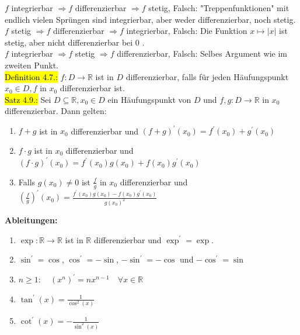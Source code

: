 \documentclass[10pt,landscape]{article}
\newcommand{\yellow}[1]{\sethlcolor{yellow} \hl{#1}}
\newcommand{\blue}[1]{\sethlcolor{cyan} \hl{#1}}
\begin{document}
\begin{multicols}{3}
$f$ integrierbar $\Longrightarrow f$ differenzierbar $\Longrightarrow f$ stetig, Falsch: "Treppenfunktionen" mit endlich vielen Sprüngen sind integrierbar, aber weder differenzierbar, noch stetig.\\
$f$ stetig $\Longrightarrow f$ differenzierbar $\Longrightarrow f$ integrierbar, Falsch: Die Funktion $x \mapsto|x|$ ist stetig, aber nicht differenzierbar bei 0 .\\
$f$ integrierbar $\Longrightarrow f$ stetig $\Longrightarrow f$ differenzierbar, Falsch: Selbes Argument wie im zweiten Punkt.\\
\blue{Definition 4.7.:} $f: D \longrightarrow \mathbb{R}$ ist in $D$ differenzierbar, falls für jeden Häufungspunkt $x_{0} \in D, f$ in $x_{0}$ differenzierbar ist.\\
\yellow{Satz 4.9.:} Sei $D \subseteq \mathbb{R}, x_{0} \in D$ ein Häufungspunkt von $D$ und $f, g: D \longrightarrow \mathbb{R}$ in $x_{0}$ differenzierbar. Dann gelten:
\begin{enumerate}
        \item $f+g$ ist in $x_{0}$ differenzierbar und 
        $(f+g)^{\prime}\left(x_{0}\right)=f^{\prime}\left(x_{0}\right)+g^{\prime}\left(x_{0}\right)$
        \item $f \cdot g$ ist in $x_{0}$ differenzierbar und
        $(f \cdot g)^{\prime}\left(x_{0}\right)=f^{\prime}\left(x_{0}\right) g\left(x_{0}\right)+f\left(x_{0}\right) g^{\prime}\left(x_{0}\right)$
        \item Falls $g\left(x_{0}\right) \neq 0$ ist $\frac{f}{g}$ in $x_{0}$ differenzierbar und
        $\left(\frac{f}{g}\right)^{\prime}\left(x_{0}\right)=\frac{f^{\prime}\left(x_{0}\right) g\left(x_{0}\right)-f\left(x_{0}\right) g^{\prime}\left(x_{0}\right)}{g\left(x_{0}\right)^{2}}$
\end{enumerate}
\textbf{Ableitungen:}
\begin{enumerate}
        \item $\exp : \mathbb{R} \longrightarrow \mathbb{R}$ ist in $\mathbb{R}$ differenzierbar und $\exp ^{\prime}=\exp$.
        \item $\sin ^{\prime}=\cos$, $\cos ^{\prime}=-\sin$, $-\sin ^{\prime}=-\cos$ und $-\cos ^{\prime}=\sin$
        \item $n \geq 1: \quad\left(x^{n}\right)^{\prime}=n x^{n-1} \quad \forall x \in \mathbb{R}$
        \item $\tan ^{\prime}(x)=\frac{1}{\cos ^{2}(x)}$
        \item $\cot ^{\prime}(x)=-\frac{1}{\sin ^{2}(x)}$

\end{enumerate}
\end{multicols}
\end{document}
